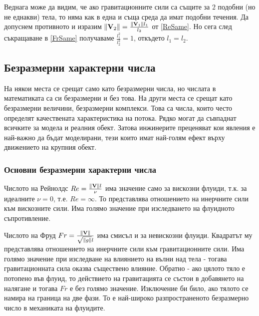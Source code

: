 Веднага може да видим, че ако гравитационните сили са същите за $2$ подобни (но не еднакви) тела, то няма как в една и съща среда да имат подобни течения.
Да допуснем противното и изразим $\norm{\mathbf{V}_2} = \frac{\norm{\mathbf{V}_1} l_1}{l_2}$ от \eqref{ReSame}.
Но сега след съкращаване в \eqref{FrSame} получаваме $\frac{l_1^2}{l_2^2} = 1$, откъдето $l_1 = l_2$.

\subsection{Безразмерни характерни числа}
На някои места се срещат само като безразмерни числа, но числата в математиката са си безразмерни и без това.
На други места се срещат като безразмерни величини, безразмерни комплекси. 
Това са числа, които често определят качествената характеристика на потока.
Рядко могат да съвпаднат всичките за модела и реалния обект.
Затова инжинерите преценяват кои явления е най-важно да бъдат моделирани, тези които имат най-голям ефект върху движението на крупния обект.

\subsubsection{Основни безразмерни характерни числа}
Числото на Рейнолдс $Re = \frac{\norm{\mathbf{V}} l}{\nu}$ има значение само за вискозни флуиди, т.к. за идеалните $\nu = 0$, т.е. $Re = \infty$.
То представлява отношението на инерчните сили към вискозните сили.
Има голямо значение при изследването на флуидното съпротивление.

Числото на Фруд $Fr = \frac{\norm{\mathbf{V}}}{\sqrt{\norm{g}} l}$ има смисъл и за невискозни флуиди.
Квадратът му представлява отношението на инерчните сили към гравитационните сили. 
Има голямо значение при изследване на влиянието на вълни над тела - тогава гравитационната сила оказва съществено влияние.
Обратно - ако цялото тяло е потопено във флуид, то действието на гравитацията се състои в добавянето на налягане и тогава $Fr$ е без голямо значение.
Изключение би било, ако тялото се намира на граница на две фази.
То е най-широко разпространеното безразмерно число в механиката на флуидите.

